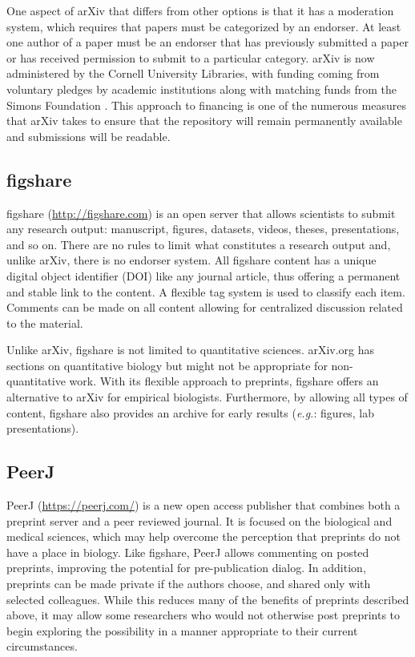 \documentclass[10pt]{article}
\begin{document}
One aspect of arXiv that differs from other options is that it has a moderation
system, which requires that papers must be categorized by an endorser.  At least
one author of a paper must be an endorser that has previously submitted a paper
or has received permission to submit to a particular category. arXiv is now
administered by the Cornell University Libraries, with funding coming from
voluntary pledges by academic institutions along with matching funds from the
Simons Foundation \cite{arxiv_future}. This approach to financing is one of the
numerous measures that arXiv takes to ensure that the repository will remain
permanently available and submissions will be readable.

\subsection*{figshare}

figshare (\href{http://figshare.com}{http://figshare.com}) is an open server
that allows scientists to submit any research output: manuscript, figures,
datasets, videos, theses, presentations, and so on. There are no rules to limit
what constitutes a research output and, unlike arXiv, there is no endorser
system. All figshare content has a unique digital object identifier (DOI) like
any journal article, thus offering a permanent and stable link to the content.
A flexible tag system is used to classify each item. Comments can be made on all
content allowing for centralized discussion related to the material.

Unlike arXiv, figshare is not limited to quantitative sciences. arXiv.org has
sections on quantitative biology but might not be appropriate for
non-quantitative work. With its flexible approach to preprints, figshare offers
an alternative to arXiv for empirical biologists. Furthermore, by allowing all
types of content, figshare also provides an archive for early results
(\emph{e.g.}: figures, lab presentations).

\subsection*{PeerJ}

PeerJ (\href{https://peerj.com/}{https://peerj.com/}) is a new open access
publisher that combines both a preprint server and a peer reviewed journal.  It
is focused on the biological and medical sciences, which may help overcome the
perception that preprints do not have a place in biology. Like figshare, PeerJ
allows commenting on posted preprints, improving the potential for
pre-publication dialog. In addition, preprints can be made private if the
authors choose, and shared only with selected colleagues. While this reduces
many of the benefits of preprints described above, it may allow some researchers
who would not otherwise post preprints to begin exploring the possibility in a
manner appropriate to their current circumstances.
\end{document}

